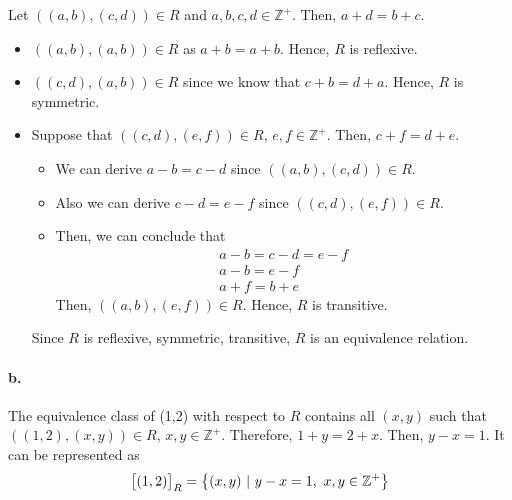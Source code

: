 \documentclass[11pt]{article}
\begin{document}
    Let $ ((a, b),(c, d)) \in R$ and $a,b,c,d \in \mathbb{Z^+}$. Then,  $a+d = b+c$.
\begin{itemize}
    \item $((a,b),(a,b)) \in R$ as $a+b = a+b$. Hence, $R$ is reflexive.
    
    \item $((c,d),(a,b))\in R$ since we know that $c+b = d+a$. Hence, $R$ is symmetric.
    
    \item Suppose that $((c,d),(e,f)) \in R$, $e,f \in \mathbb{Z^+}$. Then, $c+f = d+e$.
    \begin{itemize}
        \item We can derive $a-b = c-d$ since $ ((a, b),(c, d))\in R$.
        \item Also we can derive $c-d = e-f$ since $((c,d),(e,f)) \in R$.
        \item Then, we can conclude that
        \begin{gather*}
            a-b = c-d = e-f\\
            a-b = e-f\\
            a+f = b+e
        \end{gather*}
            Then, $((a,b),(e,f)) \in R$. Hence, $R$ is transitive.
    \end{itemize}
    Since $R$ is reflexive, symmetric, transitive, $R$ is an equivalence relation.
\end{itemize}
    
    
    
    
\paragraph{b.}

    The equivalence class of (1,2) with respect to $R$ contains all $(x,y)$ such that $((1,2),(x,y)) \in R$, $x,y \in \mathbb{Z^+}$. Therefore, $1+y = 2+x$. Then, $y-x = 1$. It can be represented as
    \begin{gather*}
         \big[ (1,2) \big]_R = \big\{(x,y) \-\ | \-\ y-x = 1, \-\ x,y \in \mathbb{Z^+} \big\}
    \end{gather*}
    
\end{document}
